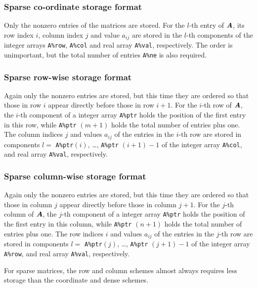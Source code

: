 \documentclass{galahad}
\begin{document}
\subsubsection{Sparse co-ordinate storage format}\label{coordinate}
Only the nonzero entries of the matrices are stored. For the 
$l$-th entry of ${\bm{A}}$, its row index $i$, column index $j$ 
and value $a_{ij}$
are stored in the $l$-th components of the integer arrays {\tt A\%row}, 
{\tt A\%col} and real array {\tt A\%val}, respectively.
The order is unimportant, but the total
number of entries {\tt A\%ne} is also required. 

\subsubsection{Sparse row-wise storage format}\label{rowwise}
Again only the nonzero entries are stored, but this time
they are ordered so that those in row $i$ appear directly before those
in row $i+1$. For the $i$-th row of ${\bm{A}}$, the $i$-th component of a 
integer array {\tt A\%ptr} holds the position of the first entry in this row,
while {\tt A\%ptr} $(m+1)$ holds the total number of entries plus one.
The column indices $j$ and values $a_{ij}$ of the entries in the $i$-th row 
are stored in components 
$l =$ {\tt A\%ptr}$(i)$, \ldots , {\tt A\%ptr} $(i+1)-1$ of the 
integer array {\tt A\%col}, and real array {\tt A\%val}, respectively. 

\subsubsection{Sparse column-wise storage format}\label{colwise}
Again only the nonzero entries are stored, but this time
they are ordered so that those in column $j$ appear directly before those
in column $j+1$. For the $j$-th column of ${\bm{A}}$, the $j$-th component of a 
integer array {\tt A\%ptr} holds the position of the first entry in this column,
while {\tt A\%ptr} $(n+1)$ holds the total number of entries plus one.
The row indices $i$ and values $a_{ij}$ of the entries in the $j$-th row 
are stored in components 
$l =$ {\tt A\%ptr}$(j)$, \ldots , {\tt A\%ptr} $(j+1)-1$ of the 
integer array {\tt A\%row}, and real array {\tt A\%val}, respectively. 

For sparse matrices, the row and column schemes almost always requires 
less storage than the coordinate and dense schemes.

\end{document}
